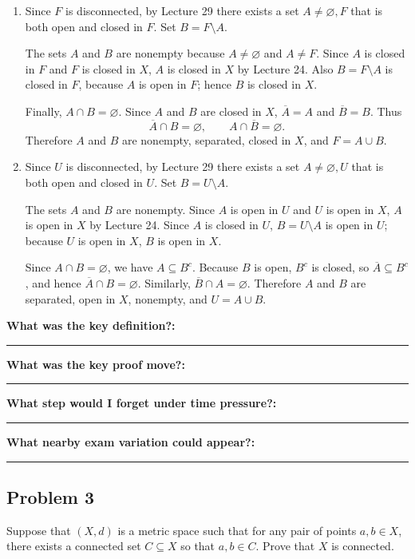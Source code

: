 \documentclass[12pt]{article}
\newcommand{\closure}[1]{\overline{#1}}
\newcommand{\writespace}[1]{\vspace*{#1}}
\newcommand{\fillfieldbig}[2]{%
  \par\noindent\textbf{#1:}\par
  \writespace{#2}
  \noindent\rule{\linewidth}{0.35pt}\par\vspace{0.15in}%
}
\newenvironment{problemstatementbox}[1]{%
  \begin{tcolorbox}[
    enhanced,
    breakable,
    colback=probblue,
    colframe=blue!55!black,
    fonttitle=\bfseries,
    title={Problem Statement\hfill #1}
  ]
}{%
  \end{tcolorbox}
}
\newenvironment{solutionbox}[1]{%
  \begin{tcolorbox}[
    enhanced,
    breakable,
    colback=solgreen,
    colframe=green!45!black,
    fonttitle=\bfseries,
    title={#1}
  ]
}{%
  \end{tcolorbox}
}
\newcommand{\reflectionpage}[1]{%
  \begin{tcolorbox}[
    enhanced,
    colback=reflectcyan,
    colframe=cyan!55!black,
    fonttitle=\bfseries,
    title={Reflection \& Variation\hfill #1},
    height=8.45in
  ]
  \fillfieldbig{What was the key definition?}{1.15in}
  \fillfieldbig{What was the key proof move?}{1.15in}
  \fillfieldbig{What step would I forget under time pressure?}{1.15in}
  \fillfieldbig{What nearby exam variation could appear?}{1.35in}
  \end{tcolorbox}
}
\begin{document}
\newpage
\begin{solutionbox}{Official Solution (Professor)}
\begin{enumerate}[label=(\alph*)]
  \item Since \(F\) is disconnected, by Lecture 29 there exists a set \(A\neq\varnothing,F\) that is both open and closed in \(F\). Set \(B=F\setminus A\).

  The sets \(A\) and \(B\) are nonempty because \(A\neq\varnothing\) and \(A\neq F\). Since \(A\) is closed in \(F\) and \(F\) is closed in \(X\), \(A\) is closed in \(X\) by Lecture 24. Also \(B=F\setminus A\) is closed in \(F\), because \(A\) is open in \(F\); hence \(B\) is closed in \(X\).

  Finally, \(A\cap B=\varnothing\). Since \(A\) and \(B\) are closed in \(X\), \(\closure{A}=A\) and \(\closure{B}=B\). Thus
  \[
    \closure{A}\cap B=\varnothing,
    \qquad
    A\cap\closure{B}=\varnothing.
  \]
  Therefore \(A\) and \(B\) are nonempty, separated, closed in \(X\), and \(F=A\cup B\).

  \item Since \(U\) is disconnected, by Lecture 29 there exists a set \(A\neq\varnothing,U\) that is both open and closed in \(U\). Set \(B=U\setminus A\).

  The sets \(A\) and \(B\) are nonempty. Since \(A\) is open in \(U\) and \(U\) is open in \(X\), \(A\) is open in \(X\) by Lecture 24. Since \(A\) is closed in \(U\), \(B=U\setminus A\) is open in \(U\); because \(U\) is open in \(X\), \(B\) is open in \(X\).

  Since \(A\cap B=\varnothing\), we have \(A\subseteq B^c\). Because \(B\) is open, \(B^c\) is closed, so \(\closure{A}\subseteq B^c\), and hence \(\closure{A}\cap B=\varnothing\). Similarly, \(\closure{B}\cap A=\varnothing\). Therefore \(A\) and \(B\) are separated, open in \(X\), nonempty, and \(U=A\cup B\).
\end{enumerate}
\end{solutionbox}

\newpage
\reflectionpage{Homework 11, Problem 2}

\newpage
\subsection{Problem 3}

\begin{problemstatementbox}{Homework 11, Problem 3}
Suppose that \((X,d)\) is a metric space such that for any pair of points \(a,b\in X\), there exists a connected set \(C\subseteq X\) so that \(a,b\in C\). Prove that \(X\) is connected.
\end{problemstatementbox}
\end{document}
